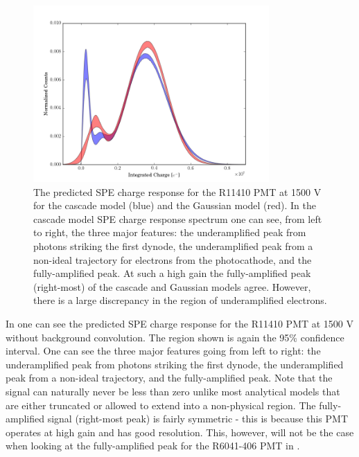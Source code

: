 \begin{figure}[t]
\centering
\includegraphics[width=9cm]{uc_spe_response.png}
\caption{The predicted SPE charge response for the R11410 PMT at 1500 V for the cascade model (blue) and the Gaussian model (red).  In the cascade model SPE charge response spectrum one can see, from left to right, the three major features: the underamplified peak from photons striking the first dynode, the underamplified peak from a non-ideal trajectory for electrons from the photocathode, and the fully-amplified peak.  At such a high gain the fully-amplified peak (right-most) of the cascade and Gaussian models agree.  However, there is a large discrepancy in the region of underamplified electrons.}
\label{fig:fig-2}
\end{figure}




In  one can see the predicted SPE charge response for the R11410 PMT at 1500 V without background convolution.  The region shown is again the 95\% confidence interval.  One can see the three major features going from left to right: the underamplified peak from photons striking the first dynode, the underamplified peak from a non-ideal trajectory, and the fully-amplified peak.  Note that the signal can naturally never be less than zero unlike most analytical models that are either truncated or allowed to extend into a non-physical region.  The fully-amplified signal (right-most peak) is fairly symmetric - this is because this PMT operates at high gain and has good resolution.  This, however, will not be the case when looking at the fully-amplified peak for the R6041-406 PMT in .




